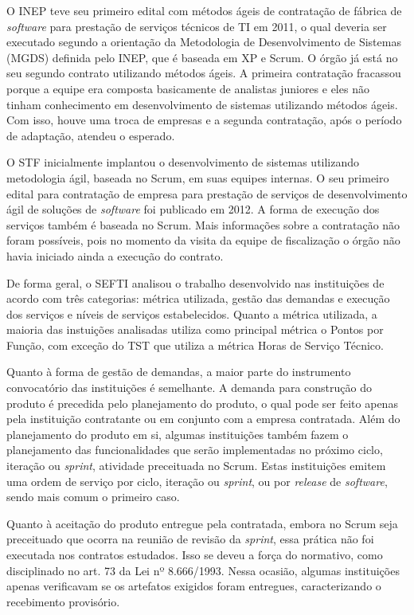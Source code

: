 O INEP teve seu primeiro edital com métodos ágeis de contratação de fábrica de \textit{software} para prestação de serviços técnicos de TI em 2011, o qual deveria ser executado segundo a orientação da Metodologia de Desenvolvimento de Sistemas (MGDS) definida pelo INEP, que é baseada em XP e Scrum. O órgão já está no seu segundo contrato utilizando métodos ágeis. A primeira contratação fracassou porque a equipe era composta basicamente de analistas juniores e eles não tinham conhecimento em desenvolvimento de sistemas utilizando métodos ágeis. Com isso, houve uma troca de empresas e a segunda contratação, após o período de adaptação, atendeu o esperado.

O STF inicialmente implantou o desenvolvimento de sistemas utilizando metodologia ágil, baseada no Scrum, em suas equipes internas. O seu primeiro edital para contratação de empresa para prestação de serviços de desenvolvimento ágil de soluções de \textit{software} foi publicado em 2012. A forma de execução dos serviços também é baseada no Scrum. Mais informações sobre a contratação não foram possíveis, pois no momento da visita da equipe de fiscalização o órgão não havia iniciado ainda a execução do contrato. 

De forma geral, o SEFTI analisou o trabalho desenvolvido nas instituições de acordo com três categorias: métrica utilizada, gestão das demandas e execução dos serviços e níveis de serviços estabelecidos. Quanto a métrica utilizada, a maioria das instuições analisadas utiliza como principal métrica o Pontos por Função, com exceção do TST que utiliza a métrica Horas de Serviço Técnico. 

Quanto à forma de gestão de demandas, a maior parte do instrumento convocatório das instituições é semelhante. A demanda para construção do produto é precedida pelo planejamento do produto, o qual pode ser feito apenas pela instituição contratante ou em conjunto com a empresa contratada. Além do planejamento do produto em si, algumas instituições também fazem o planejamento das funcionalidades que serão implementadas no próximo ciclo, iteração ou \textit{sprint}, atividade preceituada no Scrum. Estas instituições emitem uma ordem de serviço por ciclo, iteração ou \textit{sprint}, ou por \textit{release} de \textit{software}, sendo mais comum o primeiro caso. 

Quanto à aceitação do produto entregue pela contratada, embora no Scrum seja preceituado que ocorra na reunião de revisão da \textit{sprint}, essa prática não foi executada nos contratos estudados. Isso se deveu a força do normativo, como disciplinado no art. 73 da Lei nº 8.666/1993. Nessa ocasião, algumas instituições apenas verificavam se os artefatos exigidos foram entregues, caracterizando o recebimento provisório. 

